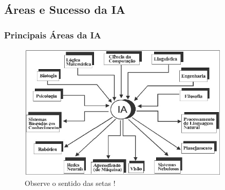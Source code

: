\documentclass{beamer}
\begin{document}

\subsection{Áreas e Sucesso da IA}
\begin{frame}
\frametitle{Principais Áreas da IA}

\begin{figure}[ht!]
 \centering
 \includegraphics[width=0.9\textwidth , height=0.7\textheight]{../ia_combinatoria/figures/areas_da_IA.jpg}

\caption{Observe o sentido das setas !}

\end{figure}



\end{frame}
\end{document}
